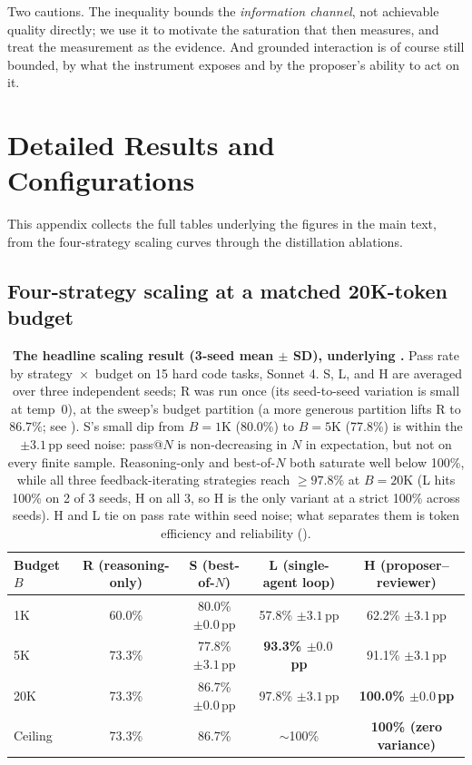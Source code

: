 Two cautions. The inequality bounds the \emph{information channel}, not achievable quality directly; we use it to motivate the saturation that  then measures, and treat the measurement as the evidence. And grounded interaction is of course still bounded, by what the instrument exposes and by the proposer's ability to act on it.

\section{Detailed Results and Configurations}
\label{app:detailed}
This appendix collects the full tables underlying the figures in the main text, from the four-strategy scaling curves through the distillation ablations.

\subsection{Four-strategy scaling at a matched 20K-token budget}
\begin{table}[H]
\centering
\caption{\textbf{The headline scaling result (3-seed mean $\pm$ SD), underlying .} Pass rate by strategy~$\times$~budget on 15 hard code tasks, Sonnet 4. S, L, and H are averaged over three independent seeds; R was run once (its seed-to-seed variation is small at temp~0), at the sweep's budget partition (a more generous partition lifts R to $86.7\%$; see ). S's small dip from $B{=}1$K (80.0\%) to $B{=}5$K (77.8\%) is within the $\pm 3.1$\,pp seed noise: pass@$N$ is non-decreasing in $N$ in expectation, but not on every finite sample. Reasoning-only and best-of-$N$ both saturate well below 100\%, while all three feedback-iterating strategies reach $\geq97.8\%$ at $B{=}20$K (L hits 100\% on 2 of 3 seeds, H on all 3, so H is the only variant at a strict 100\% across seeds). H and L tie on pass rate within seed noise; what separates them is token efficiency and reliability ().}
\label{tab:scaling-curves}
\small
\begin{tabular}{lcccc}
\toprule
Budget $B$ & R (reasoning-only) & S (best-of-$N$) & L (single-agent loop) & H (proposer--reviewer) \\
\midrule
1K   & 60.0\% & 80.0\% $\pm 0.0$\,pp & 57.8\% $\pm 3.1$\,pp & 62.2\% $\pm 3.1$\,pp \\
5K   & 73.3\% & 77.8\% $\pm 3.1$\,pp & \textbf{93.3\% $\pm 0.0$\,pp} & 91.1\% $\pm 3.1$\,pp \\
20K  & 73.3\% & 86.7\% $\pm 0.0$\,pp & 97.8\% $\pm 3.1$\,pp & \textbf{100.0\% $\pm 0.0$\,pp} \\
\midrule
Ceiling & 73.3\% & 86.7\% & $\sim$100\% & \textbf{100\% (zero variance)} \\
\bottomrule
\end{tabular}
\end{table}

